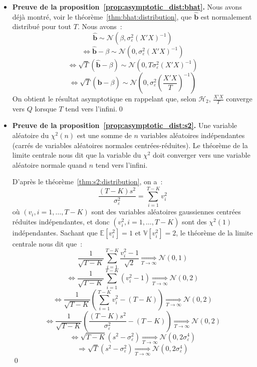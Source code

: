 \documentclass[10pt]{beamer}
\begin{document}
\begin{notes}

  \begin{itemize}

  \item \textbf{Preuve de la proposition~\ref{prop:asymptotic_dist:bhat}.} Nous avons déjà montré, voir le théorème~\ref{thm:bhat:distribution}, que $\hat{\mathbf b}$ est normalement distribué pour tout $T$. Nous avons~:
    \[
      \hat{\mathbf b} \sim \mathcal N \left( \beta, \sigma_{\varepsilon}^2(X'X)^{-1}\right)
    \]
    \[
      \Leftrightarrow \hat{\mathbf b}-\beta \sim \mathcal N \left( 0, \sigma_{\varepsilon}^2(X'X)^{-1}\right)
    \]
    \[
      \Leftrightarrow \sqrt{T}\left( \hat{\mathbf b}-\beta \right) \sim \mathcal N \left( 0, T \sigma_{\varepsilon}^2(X'X)^{-1}\right)
    \]
    \[
      \Leftrightarrow \sqrt{T}\left( \hat{\mathbf b}-\beta \right) \sim \mathcal N \left( 0, \sigma_{\varepsilon}^2\left( \frac{X'X}{T} \right)^{-1}\right)
    \]
    On obtient le résultat asymptotique en rappelant que, selon $\mathcal H_2$, $\frac{X'X}{T}$ converge vers $Q$ lorsque $T$ tend vers l'infini.\qed\newline

  \item \textbf{Preuve de la proposition~\ref{prop:asymptotic_dist:s2}.} Une variable aléatoire du $\chi^2(n)$ est une somme de $n$ variables aléatoires indépendantes (carrés de variables aléatoires normales centrées-réduites). Le théorème de la limite centrale nous dit que la variable du $\chi^2$ doit converger vers une variable aléatoire normale quand $n$ tend vers l'infini.\newline

    D'après le théorème~\ref{thm:s2:distribution}, on a~:
    \[
      \frac{(T-K)s^2}{\sigma_{\varepsilon}^2} = \sum_{i=1}^{T-K}v_i^2
    \]
    où $(v_i, i=1,\dots,T-K)$ sont des variables aléatoires gaussiennes centrées réduites indépendantes, et donc $(v_i^2, i=1,\dots,T-K)$ sont des $\chi^2(1)$ indépendantes. Sachant que $\mathbb E\left[ v_i^2 \right]=1$ et $\mathbb V\left[ v_i^2 \right]=2$, le théorème de la limite centrale nous dit que~:
    \[
      \frac{1}{\sqrt{T-K}}\sum_{i=1}^{T-K}\frac{v_i^2-1}{\sqrt{2}} \underset{T\to\infty}{\Longrightarrow} \mathcal N(0,1)
    \]
    \[
      \Leftrightarrow \frac{1}{\sqrt{T-K}}\sum_{i=1}^{T-K} \left( v_i^2-1 \right) \underset{T\to\infty}{\Longrightarrow} \mathcal N(0,2)
    \]
    \[
      \Leftrightarrow \frac{1}{\sqrt{T-K}}\left( \sum_{i=1}^{T-K}v_i^2 - (T-K) \right) \underset{T\to\infty}{\Longrightarrow} \mathcal N(0,2)
    \]
    \[
      \Leftrightarrow \frac{1}{\sqrt{T-K}}\left( \frac{(T-K)s^2}{\sigma_{\varepsilon}^2} - (T-K) \right) \underset{T\to\infty}{\Longrightarrow} \mathcal N(0,2)
    \]
    \[
      \Leftrightarrow \sqrt{T-K}\left( s^2 - \sigma_{\varepsilon}^2 \right) \underset{T\to\infty}{\Longrightarrow} \mathcal N\left(0,2\sigma_{\varepsilon}^4 \right)
    \]
    \[
      \Rightarrow \sqrt{T}\left( s^2 - \sigma_{\varepsilon}^2 \right) \underset{T\to\infty}{\Longrightarrow} \mathcal N\left(0,2\sigma_{\varepsilon}^4 \right)
    \]
    \qed
  \end{itemize}

\end{notes}
\end{document}
